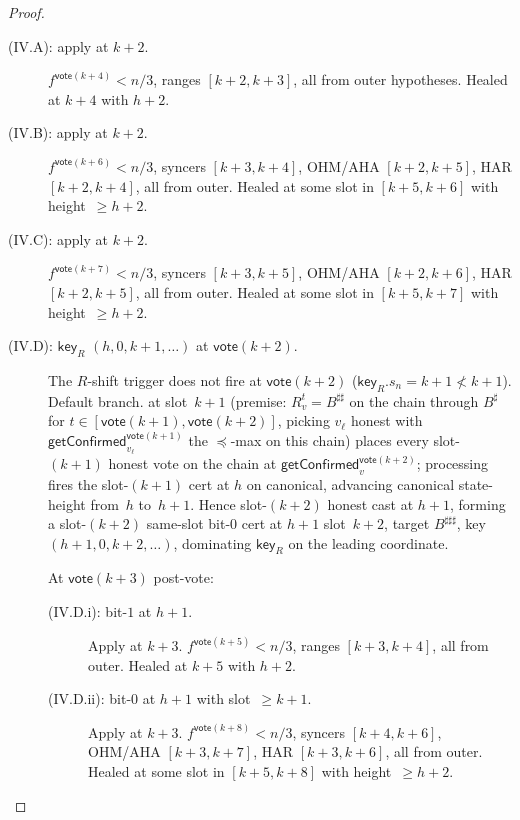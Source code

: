 \documentclass{article}
\newcommand{\key}{\mathsf{key}}
\newcommand{\vote}{\mathsf{vote}}
\newcommand{\getConfirmed}{\textsf{getConfirmed}\xspace}
\theoremstyle{plain}
\theoremstyle{definition}
\theoremstyle{remark}
\begin{document}
\begin{proof}
\begin{description}
\begin{description}
\item[{(IV.A): apply  at $k+2$.}]\hfill
$f^{\vote(k+4)} < n/3$, ranges $[k+2, k+3]$, all from outer hypotheses. Healed at $k+4$ with $h+2$.

\item[{(IV.B): apply  at $k+2$.}]\hfill
$f^{\vote(k+6)} < n/3$, syncers $[k+3, k+4]$, OHM/AHA $[k+2, k+5]$, HAR $[k+2, k+4]$, all from outer. Healed at some slot in $[k+5, k+6]$ with height~$\geq h+2$.

\item[{(IV.C): apply  at $k+2$.}]\hfill
$f^{\vote(k+7)} < n/3$, syncers $[k+3, k+5]$, OHM/AHA $[k+2, k+6]$, HAR $[k+2, k+5]$, all from outer. Healed at some slot in $[k+5, k+7]$ with height~$\geq h+2$.

\item[{(IV.D): $\key_R$ $(h, 0, k+1, \ldots)$ at $\vote(k+2)$.}]\hfill
The $R$-shift trigger does not fire at $\vote(k+2)$ ($\key_R.s_n = k+1 \not< k+1$). Default branch.  at slot~$k+1$ (premise: $R_v^t = B^{\sharp\sharp}$ on the chain through $B^\sharp$ for $t \in [\vote(k+1), \vote(k+2)]$, picking $v_\ell$ honest with $\getConfirmed_{v_\ell}^{\vote(k+1)}$ the $\preceq$-max on this chain) places every slot-$(k+1)$ honest vote on the chain at $\getConfirmed_v^{\vote(k+2)}$; processing fires the slot-$(k+1)$ cert at $h$ on canonical, advancing canonical state-height from~$h$ to~$h+1$. Hence slot-$(k+2)$ honest cast at $h+1$, forming a slot-$(k+2)$ same-slot bit-$0$ cert at $h+1$ slot~$k+2$, target $B^{\sharp\sharp\sharp}$, key $(h+1, 0, k+2, \ldots)$, dominating $\key_R$ on the leading coordinate.

At $\vote(k+3)$ post-vote:
\begin{description}
  \item[{(IV.D.i): bit-$1$ at $h+1$.}] Apply  at $k+3$. $f^{\vote(k+5)} < n/3$, ranges $[k+3, k+4]$, all from outer. Healed at $k+5$ with $h+2$.
  \item[{(IV.D.ii): bit-$0$ at $h+1$ with slot~$\geq k+1$.}] Apply  at $k+3$. $f^{\vote(k+8)} < n/3$, syncers $[k+4, k+6]$, OHM/AHA $[k+3, k+7]$, HAR $[k+3, k+6]$, all from outer. Healed at some slot in $[k+5, k+8]$ with height~$\geq h+2$.
\end{description}
\end{description}


\end{description}
\end{proof}
\end{document}
